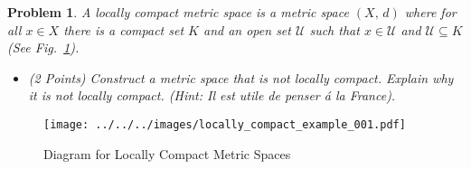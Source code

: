 \documentclass{article}
\theoremstyle{normal}
\newtheorem{problem}{Problem}
\begin{document}
    \begin{problem}
        A locally compact metric space is a metric space $(X,\,d)$ where for all
        $x\in{X}$ there is a compact set $K$ and an open set $\mathcal{U}$
        such that $x\in\mathcal{U}$ and $\mathcal{U}\subseteq{K}$
        (See Fig.~\ref{fig:locally_compact_metric_space_001}).
        \begin{itemize}
            \item (2 Points) Construct a metric space that is \textit{not}
                locally compact. Explain why it is not locally compact.
                (Hint: Il est utile de penser \'{a} la France).
        \end{itemize}
    \end{problem}
    \begin{figure}
        \centering
        \texttt{[image: ../../../images/locally\_compact\_example\_001.pdf]}
        \caption{Diagram for Locally Compact Metric Spaces}
        \label{fig:locally_compact_metric_space_001}
    \end{figure}
\end{document}
